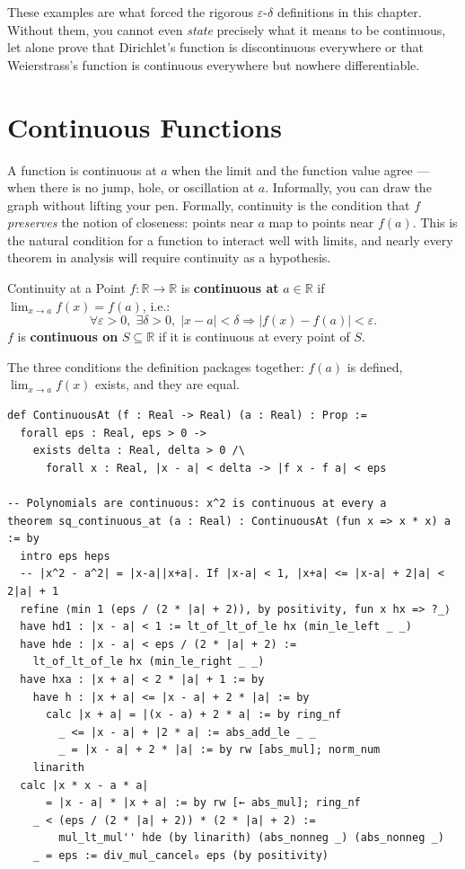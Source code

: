 \documentclass[12pt, openany]{book}
\theoremstyle{plain}
\theoremstyle{definition}
\theoremstyle{remark}
\newcommand{\R}{\mathbb{R}}
\newcommand{\eps}{\varepsilon}
\newcommand{\del}{\delta}
\begin{document}
\begin{remarkbox}
These examples are what forced the rigorous $\varepsilon$-$\delta$ definitions in this chapter. Without them, you cannot even \emph{state} precisely what it means to be continuous, let alone prove that Dirichlet's function is discontinuous everywhere or that Weierstrass's function is continuous everywhere but nowhere differentiable.
\end{remarkbox}
\color{black}

\section{Continuous Functions}

A function is continuous at $a$ when the limit and the function value agree --- when there is no jump, hole, or oscillation at $a$.  Informally, you can draw the graph without lifting your pen.  Formally, continuity is the condition that $f$ \emph{preserves} the notion of closeness: points near $a$ map to points near $f(a)$.  This is the natural condition for a function to interact well with limits, and nearly every theorem in analysis will require continuity as a hypothesis.

\begin{defbox}{Continuity at a Point}
$f : \R \to \R$ is \textbf{continuous at} $a \in \R$ if $\lim_{x \to a} f(x) = f(a)$, i.e.:
\[ \forall \eps > 0,\; \exists \del > 0,\; |x - a| < \del \Rightarrow |f(x) - f(a)| < \eps. \]
$f$ is \textbf{continuous on} $S \subseteq \R$ if it is continuous at every point of $S$.
\end{defbox}
\color{black}

The three conditions the definition packages together: $f(a)$ is defined, $\lim_{x\to a} f(x)$ exists, and they are equal.

\begin{leanbox}
\begin{lstlisting}
def ContinuousAt (f : Real -> Real) (a : Real) : Prop :=
  forall eps : Real, eps > 0 ->
    exists delta : Real, delta > 0 /\
      forall x : Real, |x - a| < delta -> |f x - f a| < eps

-- Polynomials are continuous: x^2 is continuous at every a
theorem sq_continuous_at (a : Real) : ContinuousAt (fun x => x * x) a := by
  intro eps heps
  -- |x^2 - a^2| = |x-a||x+a|. If |x-a| < 1, |x+a| <= |x-a| + 2|a| < 2|a| + 1
  refine ⟨min 1 (eps / (2 * |a| + 2)), by positivity, fun x hx => ?_⟩
  have hd1 : |x - a| < 1 := lt_of_lt_of_le hx (min_le_left _ _)
  have hde : |x - a| < eps / (2 * |a| + 2) :=
    lt_of_lt_of_le hx (min_le_right _ _)
  have hxa : |x + a| < 2 * |a| + 1 := by
    have h : |x + a| <= |x - a| + 2 * |a| := by
      calc |x + a| = |(x - a) + 2 * a| := by ring_nf
        _ <= |x - a| + |2 * a| := abs_add_le _ _
        _ = |x - a| + 2 * |a| := by rw [abs_mul]; norm_num
    linarith
  calc |x * x - a * a|
      = |x - a| * |x + a| := by rw [← abs_mul]; ring_nf
    _ < (eps / (2 * |a| + 2)) * (2 * |a| + 2) :=
        mul_lt_mul'' hde (by linarith) (abs_nonneg _) (abs_nonneg _)
    _ = eps := div_mul_cancel₀ eps (by positivity)
\end{lstlisting}
\end{leanbox}
\color{black}
\end{document}
